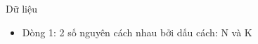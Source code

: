 Dữ liệu
\begin{itemize}
	\item     Dòng 1: 2 số nguyên cách nhau bởi dấu cách: N và K   
\end{itemize}